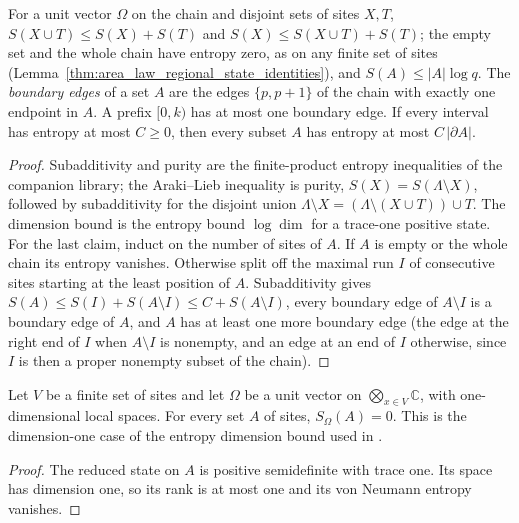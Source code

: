 \begin{lemma}
    \label{lem:chain_entropy_inequalities}
    \leanok
    For a unit vector $\Omega$ on the chain and disjoint sets of sites $X,T$,
    $S(X\cup T)\le S(X)+S(T)$ and $S(X)\le S(X\cup T)+S(T)$; the empty set and
    the whole chain have entropy zero, as on any finite set of sites
    (Lemma~\ref{thm:area_law_regional_state_identities}), and
    $S(A)\le|A|\log q$. The
    \emph{boundary edges} of a set $A$ are the edges $\{p,p+1\}$ of the chain
    with exactly one endpoint in $A$. A prefix $[0,k)$ has at most one boundary edge.
    If every interval has entropy at most
    $C\ge0$, then every subset $A$ has entropy at most $C\,|\partial A|$.
\end{lemma}
\begin{proof}
    \leanok
    Subadditivity and purity are the finite-product entropy inequalities of the
    companion library; the Araki--Lieb inequality is purity,
    $S(X)=S(\Lambda\setminus X)$, followed by subadditivity for the disjoint
    union $\Lambda\setminus X=(\Lambda\setminus(X\cup T))\cup T$. The dimension
    bound is the entropy bound $\log\dim$ for a trace-one positive state. For
    the last claim, induct on the number of sites of $A$. If $A$ is empty or
    the whole chain its entropy vanishes. Otherwise split off the maximal run
    $I$ of consecutive sites starting at the least position of $A$.
    Subadditivity gives $S(A)\le S(I)+S(A\setminus I)\le C+S(A\setminus I)$,
    every boundary edge of $A\setminus I$ is a boundary edge of $A$, and $A$
    has at least one more boundary edge (the edge at the right end of $I$ when
    $A\setminus I$ is nonempty, and an edge at an end of $I$ otherwise, since
    $I$ is then a proper nonempty subset of the chain).
\end{proof}

\begin{lemma}
    \label{thm:chain_entropy_dim_one}
    \leanok
    Let $V$ be a finite set of sites and let $\Omega$ be a unit vector on
    $\bigotimes_{x\in V}\mathbb C$, with one-dimensional local spaces.
    For every set $A$ of sites, $S_\Omega(A)=0$. This is the
    dimension-one case of the entropy dimension bound used in
    \cite[Part~I]{TNLean2026OneDimensional}.
\end{lemma}
\begin{proof}
    \leanok
    The reduced state on $A$ is positive semidefinite with trace one.
    Its space has dimension one, so its rank is at most one and its
    von Neumann entropy vanishes.
\end{proof}

